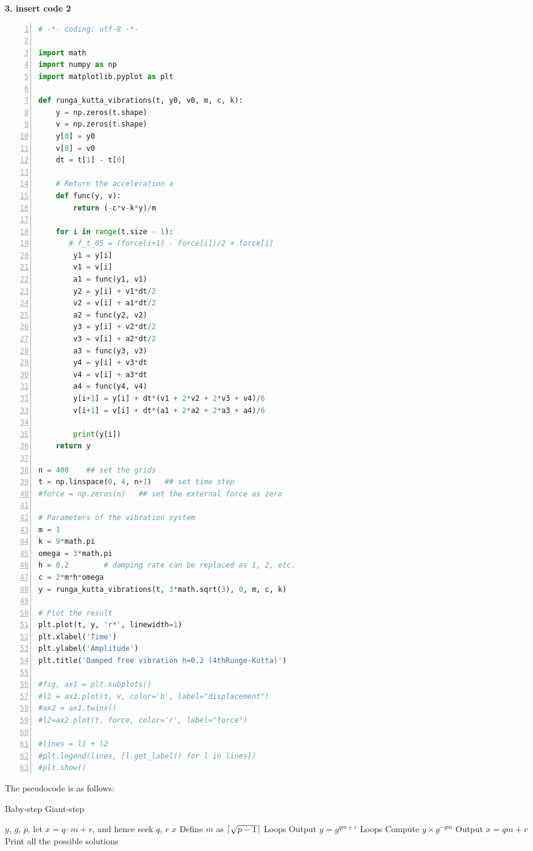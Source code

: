 \documentclass[10pt]{article} %
\DeclarePairedDelimiter{\ceil}{\lceil}{\rceil}
\begin{document}
\textbf{3. insert code 2}
\begin{lstlisting}[language=Python, numbers=left, numberstyle=\tiny]
# -*- coding: utf-8 -*-

import math
import numpy as np
import matplotlib.pyplot as plt

def runga_kutta_vibrations(t, y0, v0, m, c, k):
    y = np.zeros(t.shape)
    v = np.zeros(t.shape)
    y[0] = y0
    v[0] = v0
    dt = t[1] - t[0]

    # Return the acceleration a
    def func(y, v):
        return (-c*v-k*y)/m
        
    for i in range(t.size - 1):
       # f_t_05 = (force[i+1] - force[i])/2 + force[i]
        y1 = y[i]
        v1 = v[i]
        a1 = func(y1, v1)
        y2 = y[i] + v1*dt/2
        v2 = v[i] + a1*dt/2
        a2 = func(y2, v2)
        y3 = y[i] + v2*dt/2
        v3 = v[i] + a2*dt/2
        a3 = func(y3, v3)
        y4 = y[i] + v3*dt
        v4 = v[i] + a3*dt
        a4 = func(y4, v4)
        y[i+1] = y[i] + dt*(v1 + 2*v2 + 2*v3 + v4)/6
        v[i+1] = v[i] + dt*(a1 + 2*a2 + 2*a3 + a4)/6

        print(y[i])
    return y

n = 400    ## set the grids
t = np.linspace(0, 4, n+1)   ## set time step
#force = np.zeros(n)   ## set the external force as zero

# Parameters of the vibration system
m = 1
k = 9*math.pi
omega = 3*math.pi
h = 0.2        # damping rate can be replaced as 1, 2, etc.
c = 2*m*h*omega
y = runga_kutta_vibrations(t, 3*math.sqrt(3), 0, m, c, k)

# Plot the result
plt.plot(t, y, 'r*', linewidth=1)
plt.xlabel('Time')
plt.ylabel('Amplitude')
plt.title('Damped free vibration h=0.2 (4thRunge-Kutta)')

#fig, ax1 = plt.subplots()
#l1 = ax1.plot(t, v, color='b', label="displacement")
#ax2 = ax1.twinx()
#l2=ax2.plot(t, force, color='r', label="force")

#lines = l1 + l2
#plt.legend(lines, [l.get_label() for l in lines])
#plt.show()
\end{lstlisting}

The pseudocode is as follows:\\
\begin{algorithm}[H]
    \caption{Baby-step Giant-step}
    \begin{algorithmic}[1] %
        \Require $y$, $g$, $p$, let $x = q\cdot m + r$, and hence seek $q$, $r$
        \Ensure $x$
        \State Define $m$ as $\ceil{\sqrt{p-1}}$
        \State Loops
        \State Output $y=g^{qm+r}$
        \EndIf
        \EndFor
        \State Loops
        \State Compute $y\times g^{-qm}$
        \State Output $x = qm+r$
        \EndIf
        \EndFor
        \State Print all the possible solutions
    \end{algorithmic}
\end{algorithm}
\end{document}
